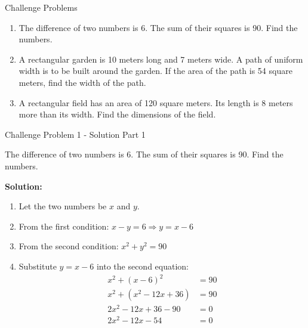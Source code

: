 \documentclass[aspectratio=169]{beamer}
\begin{document}
\begin{frame}{Challenge Problems}
    \begin{tcolorbox}[colback=lightgray,colframe=primary,title=Solve Each of the Following]
        \footnotesize
        \begin{enumerate}
            \setlength{\itemsep}{0.5em}
            \item The difference of two numbers is 6. The sum of their squares is 90. Find the numbers.
            \item A rectangular garden is 10 meters long and 7 meters wide. A path of uniform width is to be built around the garden. If the area of the path is 54 square meters, find the width of the path.
            \item A rectangular field has an area of 120 square meters. Its length is 8 meters more than its width. Find the dimensions of the field.
        \end{enumerate}
    \end{tcolorbox}
\end{frame}

\begin{frame}{Challenge Problem 1 - Solution Part 1}
    \begin{tcolorbox}[colback=lightgray,colframe=accent,title=Detailed Solution (Part 1)]
        \footnotesize
        The difference of two numbers is 6. The sum of their squares is 90. Find the numbers.
        
        \textbf{Solution:}
        \begin{enumerate}
            \setlength{\itemsep}{0.5em}
            \item Let the two numbers be $x$ and $y$.
            \item From the first condition: $x - y = 6 \Rightarrow y = x - 6$
            \item From the second condition: $x^2 + y^2 = 90$
            \item Substitute $y = x - 6$ into the second equation:
            \begin{align*}
                x^2 + (x - 6)^2 &= 90 \\
                x^2 + (x^2 - 12x + 36) &= 90 \\
                2x^2 - 12x + 36 - 90 &= 0 \\
                2x^2 - 12x - 54 &= 0
            \end{align*}
        \end{enumerate}
    \end{tcolorbox}
\end{frame}
\end{document}
